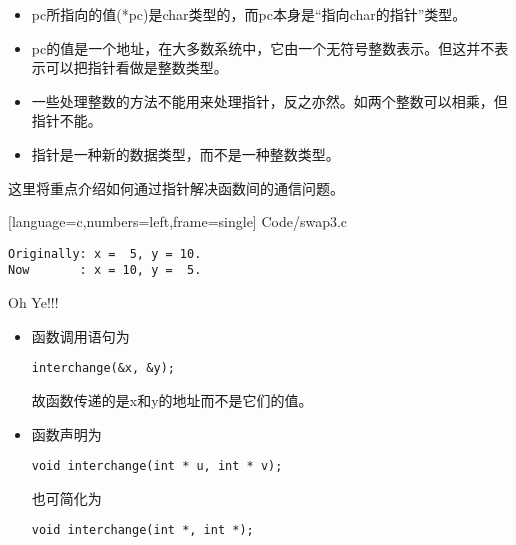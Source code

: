 \begin{frame}[fragile]
\begin{itemize}
\item
{\tf pc}所指向的值{\tf (*pc)}是{\tf char}类型的，而{\tf pc}本身是“指向{\tf char}的指针”类型。\\[0.1in]
\item 
{\tf pc}的值是一个地址，在大多数系统中，它由一个无符号整数表示。但这并不表示可以把指针看做是整数类型。\\[0.1in]
\item 
一些处理整数的方法不能用来处理指针，反之亦然。如两个整数可以相乘，但指针不能。\\[0.1in]
\item 
指针是一种新的数据类型，而不是一种整数类型。
\end{itemize}
\end{frame}

\begin{frame}[fragile]
这里将重点介绍如何通过指针解决函数间的通信问题。
\end{frame}

\begin{frame}
  
  [language=c,numbers=left,frame=single]  
  {Code/swap3.c}
\end{frame}

\begin{frame}[fragile]\ft{\secname}
\begin{lstlisting}[backgroundcolor=\color{blue!10}]
Originally: x =  5, y = 10.
Now       : x = 10, y =  5.
\end{lstlisting}
\pause \vspace{0.1in}

\begin{center}
{\Large Oh Ye!!!}
\end{center}
\end{frame}

\begin{frame}[fragile]
\begin{itemize}
\item 
函数调用语句为
\begin{lstlisting}[backgroundcolor=\color{blue!10}]
interchange(&x, &y);
\end{lstlisting}
故函数传递的是{\tf x}和{\tf y}的地址而不是它们的值。\\[0.15in]
\item 
函数声明为
\begin{lstlisting}[backgroundcolor=\color{blue!10}]
void interchange(int * u, int * v);
\end{lstlisting}
也可简化为
\begin{lstlisting}[backgroundcolor=\color{blue!10}]
void interchange(int *, int *);
\end{lstlisting}
\end{itemize}
\end{frame}

